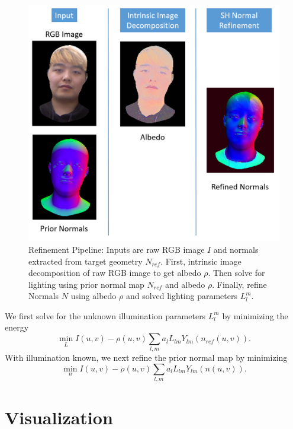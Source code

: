 \documentclass[10pt,twocolumn,letterpaper]{article}
\begin{document}
\begin{figure}[!h]
    \begin{center}
        \includegraphics [scale=0.25] {image/refine_pipeline.png}
    \end{center}
    \caption{Refinement Pipeline: Inputs are raw RGB image $I$ and normals extracted from target geometry $N_{ref}$. First, intrinsic image decomposition of raw RGB image to get albedo $\rho$. Then solve for lighting using prior normal map $N_{ref}$ and albedo $\rho$. Finally, refine Normals $N$ using albedo $\rho$ and solved lighting parameters $L_l^m$.}
    \label{fig:pipe2}
\end{figure} 
We first solve for the unknown illumination parameters $L_l^m$ by minimizing the energy
\begin{equation}
\min_{L} I(u,v) - \rho(u,v) \sum_{l,m} a_l L_{lm} Y_{lm}(n_{ref}(u,v)).
\end{equation}
With illumination known, we next refine the prior normal map by minimizing
\begin{equation}
\min_{n} I(u,v) - \rho(u,v) \sum_{l,m} a_l L_{lm} Y_{lm}(n(u,v)).
\end{equation}

\section{Visualization}
\end{document}
